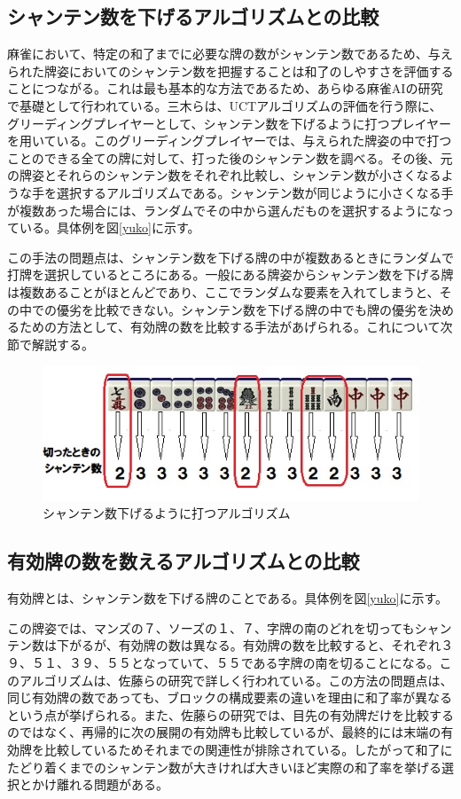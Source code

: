 \subsection{シャンテン数を下げるアルゴリズムとの比較}
麻雀において、特定の和了までに必要な牌の数がシャンテン数であるため、与えられた牌姿においてのシャンテン数を把握することは和了のしやすさを評価することにつながる。これは最も基本的な方法であるため、あらゆる麻雀AIの研究で基礎として行われている。三木ら\cite{miki_UCT}は、UCTアルゴリズムの評価を行う際に、グリーディングプレイヤーとして、シャンテン数を下げるように打つプレイヤーを用いている。このグリーディングプレイヤーでは、与えられた牌姿の中で打つことのできる全ての牌に対して、打った後のシャンテン数を調べる。その後、元の牌姿とそれらのシャンテン数をそれぞれ比較し、シャンテン数が小さくなるような手を選択するアルゴリズムである。シャンテン数が同じように小さくなる手が複数あった場合には、ランダムでその中から選んだものを選択するようになっている。具体例を図\ref{yuko}に示す。

この手法の問題点は、シャンテン数を下げる牌の中が複数あるときにランダムで打牌を選択しているところにある。一般にある牌姿からシャンテン数を下げる牌は複数あることがほとんどであり、ここでランダムな要素を入れてしまうと、その中での優劣を比較できない。シャンテン数を下げる牌の中でも牌の優劣を決めるための方法として、有効牌の数を比較する手法があげられる。これについて次節で解説する。

\begin{figure}[H]
 \centering
 \includegraphics[keepaspectratio, scale=1,bb=0 0 539 194]
      {img/syanten.jpg}
 \caption{シャンテン数下げるように打つアルゴリズム}
 \label{syanten}
\end{figure}

\subsection{有効牌の数を数えるアルゴリズムとの比較}
有効牌とは、シャンテン数を下げる牌のことである。具体例を図\ref{yuko}に示す。

この牌姿では、マンズの７、ソーズの１、７、字牌の南のどれを切ってもシャンテン数は下がるが、有効牌の数は異なる。有効牌の数を比較すると、それぞれ３９、５１、３９、５５となっていて、５５である字牌の南を切ることになる。このアルゴリズムは、佐藤ら\cite{zentsu}の研究で詳しく行われている。この方法の問題点は、同じ有効牌の数であっても、ブロックの構成要素の違いを理由に和了率が異なるという点が挙げられる。また、佐藤らの研究では、目先の有効牌だけを比較するのではなく、再帰的に次の展開の有効牌も比較しているが、最終的には末端の有効牌を比較しているためそれまでの関連性が排除されている。したがって和了にたどり着くまでのシャンテン数が大きければ大きいほど実際の和了率を挙げる選択とかけ離れる問題がある。

